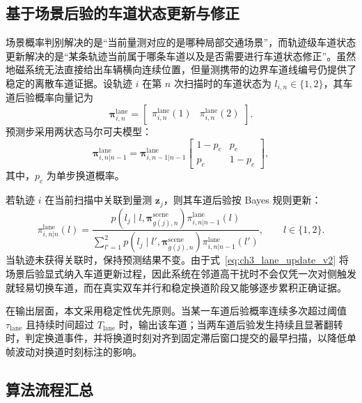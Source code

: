 \documentclass{xdupgthesis}
\begin{document}
\subsection{基于场景后验的车道状态更新与修正}

场景概率判别解决的是“当前量测对应的是哪种局部交通场景”，而轨迹级车道状态更新解决的是“某条轨迹当前属于哪条车道以及是否需要进行车道状态修正”。虽然地磁系统无法直接给出车辆横向连续位置，但量测携带的边界车道线编号仍提供了稳定的离散车道证据。设轨迹 $i$ 在第 $n$ 次扫描时的车道状态为 $l_{i,n}\in\{1,2\}$，其车道后验概率向量记为
\begin{equation}
	\boldsymbol\pi_{i,n}^{\mathrm{lane}}=
	\begin{bmatrix}
		\pi_{i,n}^{\mathrm{lane}}(1) &
		\pi_{i,n}^{\mathrm{lane}}(2)
	\end{bmatrix}.
	\label{eq:ch3_lane_vector_v2}
\end{equation}
预测步采用两状态马尔可夫模型：
\begin{equation}
	\boldsymbol\pi_{i,n|n-1}^{\mathrm{lane}}
	=
	\boldsymbol\pi_{i,n-1|n-1}^{\mathrm{lane}}
	\begin{bmatrix}
		1-p_c & p_c\\
		p_c & 1-p_c
	\end{bmatrix},
	\label{eq:ch3_lane_predict_v2}
\end{equation}
其中，$p_c$ 为单步换道概率。

若轨迹 $i$ 在当前扫描中关联到量测 $\mathbf z_j$，则其车道后验按 Bayes 规则更新：
\begin{equation}
	\pi_{i,n|n}^{\mathrm{lane}}(l)
	=
	\frac{p(l_j\mid l,\boldsymbol\pi_{g(j),n}^{\mathrm{scene}})\pi_{i,n|n-1}^{\mathrm{lane}}(l)}{\sum\limits_{l'=1}^{2}p(l_j\mid l',\boldsymbol\pi_{g(j),n}^{\mathrm{scene}})\pi_{i,n|n-1}^{\mathrm{lane}}(l')},
	\qquad l\in\{1,2\}.
	\label{eq:ch3_lane_update_v2}
\end{equation}
当轨迹未获得关联时，保持预测结果不变。由于式~\eqref{eq:ch3_lane_update_v2} 将场景后验显式纳入车道更新过程，因此系统在邻道高干扰时不会仅凭一次对侧触发就轻易切换车道，而在真实双车并行和稳定换道阶段又能够逐步累积正确证据。

在输出层面，本文采用稳定性优先原则。当某一车道后验概率连续多次超过阈值 $\tau_{\mathrm{lane}}$ 且持续时间超过 $T_{\mathrm{lane}}$ 时，输出该车道；当两车道后验发生持续且显著翻转时，判定换道事件，并将换道时刻对齐到固定滞后窗口提交的最早扫描，以降低单帧波动对换道时刻标注的影响。

\subsection{算法流程汇总}
\end{document}
